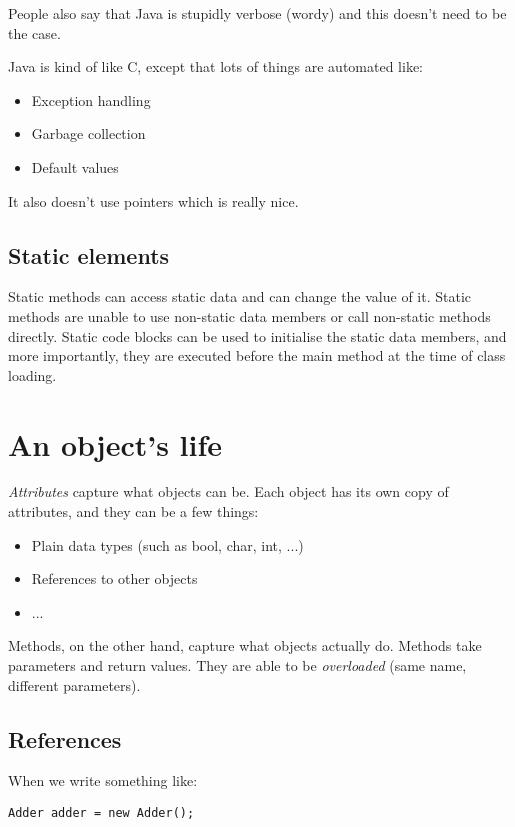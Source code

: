 \documentclass[11pt,a4paper,titlepage,dvipsnames,cmyk]{scrartcl}
\begin{document}
People also say that Java is stupidly verbose (wordy) and this doesn't
need to be the case.

Java is kind of like C, except that lots of things are automated like:
\begin{itemize}
    \item Exception handling
    \item Garbage collection
    \item Default values
\end{itemize}

It also doesn't use pointers which is really nice.

\subsection{Static elements}%
\label{sub:static}
Static methods can access static data and can change the value of it.
Static methods are unable to use non-static data members or call
non-static methods directly. Static code blocks can be used to initialise
the static data members, and more importantly, they are executed before
the main method at the time of class loading.

\section{An object's life}%
\label{sec:life-object}
\textit{Attributes} capture what objects can be. Each object has its own
copy of attributes, and they can be a few things:
\begin{itemize}
    \item Plain data types (such as bool, char, int, ...)
    \item References to other objects
    \item ...
\end{itemize}

Methods, on the other hand, capture what objects actually do. Methods take
parameters and return values. They are able to be \textit{overloaded}
(same name, different parameters).

\subsection{References}%
\label{sub:References}
When we write something like:

\begin{lstlisting}
Adder adder = new Adder();
\end{lstlisting}
\end{document}
